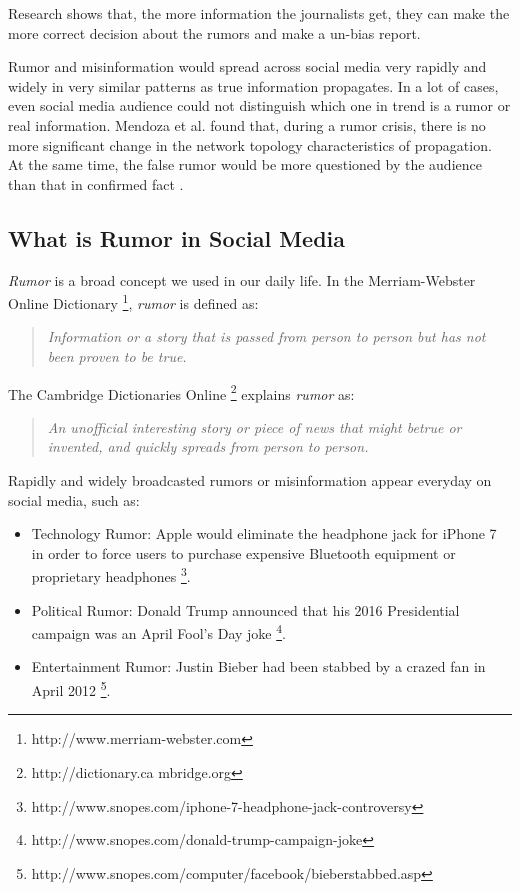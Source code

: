 Research shows that, the more information the journalists get, they can make the more correct decision about the rumors and make a un-bias report. 

Rumor and misinformation would spread across social media very rapidly and widely in very similar patterns as true information propagates. In a lot of cases, even social media audience could not distinguish which one in trend is a rumor or real information. Mendoza et al. found that, during a rumor crisis, there is no more significant change in the network topology characteristics of propagation. At the same time, the false rumor would be more questioned by the audience than that in confirmed fact \cite{Mendoza2010}.  

\subsection{What is Rumor in Social Media}
\textit{Rumor} is a broad concept we used in our daily life. In the Merriam-Webster Online Dictionary \footnote{http://www.merriam-webster.com}, \textit{rumor} is defined as:
\begin{quotation}
\textit{Information or a story that is passed from person to person but has not been proven to be true. }
\end{quotation}
The Cambridge Dictionaries Online \footnote{http://dictionary.ca    mbridge.org} explains \textit{rumor} as:
\begin{quotation}
\textit{An ​unofficial ​interesting ​story or ​piece of ​news that might be ​true or ​invented, and ​quickly ​spreads from ​person to ​person. }
\end{quotation}

Rapidly and widely broadcasted rumors or misinformation appear everyday on social media, such as:

\begin{itemize}
  	\item Technology Rumor: Apple would eliminate the headphone jack for iPhone 7 in order to force users to purchase expensive Bluetooth equipment or proprietary headphones \footnote{http://www.snopes.com/iphone-7-headphone-jack-controversy}.
  	\item Political Rumor: Donald Trump announced that his 2016 Presidential campaign was an April Fool's Day joke \footnote{http://www.snopes.com/donald-trump-campaign-joke}.
  	\item Entertainment Rumor: Justin Bieber had been stabbed by a crazed fan in April 2012 \footnote{http://www.snopes.com/computer/facebook/bieberstabbed.asp}.
\end{itemize}

